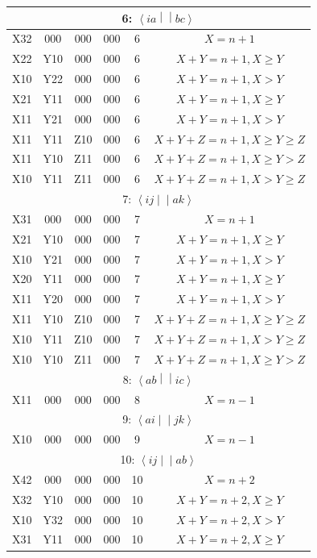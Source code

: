 \documentclass{article}
\newcommand{\tei}[2]{\left<{#1}\middle|\middle|{#2}\right>}
\begin{document}
\begin{longtable}{cccccc}
    \hline
    \multicolumn{6}{c}{6: $\tei{ia}{bc}$}\\
    \hline
    X32 & 000 & 000 & 000 & 6 & $X = n + 1$\\
    X22 & Y10 & 000 & 000 & 6 & $X + Y = n + 1, X \ge Y$\\
    X10 & Y22 & 000 & 000 & 6 & $X + Y = n + 1, X > Y$\\
    X21 & Y11 & 000 & 000 & 6 & $X + Y = n + 1, X \ge Y$\\
    X11 & Y21 & 000 & 000 & 6 & $X + Y = n + 1, X > Y$\\
    X11 & Y11 & Z10 & 000 & 6 & $X + Y + Z = n + 1, X \ge Y \ge Z$\\
    X11 & Y10 & Z11 & 000 & 6 & $X + Y + Z = n + 1, X \ge Y > Z$\\
    X10 & Y11 & Z11 & 000 & 6 & $X + Y + Z = n + 1, X > Y \ge Z$\\
    \hline
    \multicolumn{6}{c}{7: $\tei{ij}{ak}$}\\
    \hline
    X31 & 000 & 000 & 000 & 7 & $X = n + 1$\\
    X21 & Y10 & 000 & 000 & 7 & $X + Y = n + 1, X \ge Y$\\
    X10 & Y21 & 000 & 000 & 7 & $X + Y = n + 1, X > Y$\\
    X20 & Y11 & 000 & 000 & 7 & $X + Y = n + 1, X \ge Y$\\
    X11 & Y20 & 000 & 000 & 7 & $X + Y = n + 1, X > Y$\\
    X11 & Y10 & Z10 & 000 & 7 & $X + Y + Z = n + 1, X \ge Y \ge Z$\\
    X10 & Y11 & Z10 & 000 & 7 & $X + Y + Z = n + 1, X > Y \ge Z$\\
    X10 & Y10 & Z11 & 000 & 7 & $X + Y + Z = n + 1, X \ge Y > Z$\\
    \hline
    \multicolumn{6}{c}{8: $\tei{ab}{ic}$}\\
    \hline
    X11 & 000 & 000 & 000 & 8 & $X = n - 1$\\
    \hline
    \multicolumn{6}{c}{9: $\tei{ai}{jk}$}\\
    \hline
    X10 & 000 & 000 & 000 & 9 & $X = n - 1$\\
    \hline
    \multicolumn{6}{c}{10: $\tei{ij}{ab}$}\\
    \hline
    X42 & 000 & 000 & 000 & 10 & $X = n + 2$\\
    X32 & Y10 & 000 & 000 & 10 & $X + Y = n + 2, X \ge Y$\\
    X10 & Y32 & 000 & 000 & 10 & $X + Y = n + 2, X > Y$\\
    X31 & Y11 & 000 & 000 & 10 & $X + Y = n + 2, X \ge Y$\\

\end{longtable}
\end{document}
